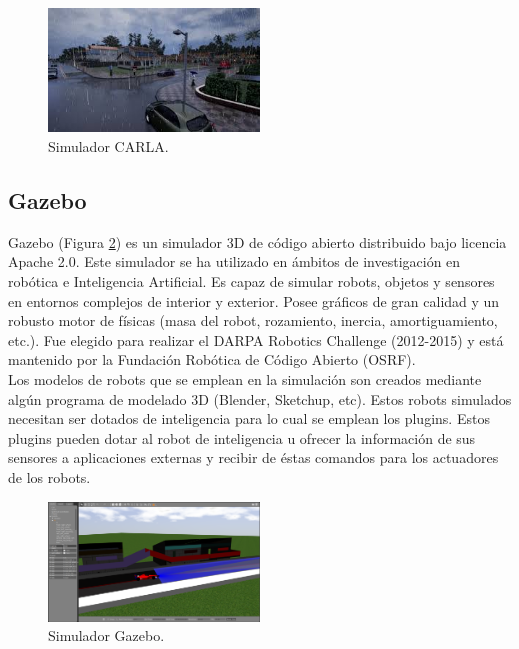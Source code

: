 \begin{figure}
\begin{center}
	\includegraphics[width=0.5\textwidth]{figures/Estado_arte/carla.jpeg}
   \caption{Simulador CARLA.}
	\label{fig.carla}
\end{center}
\end{figure}


\subsection{Gazebo}

Gazebo \cite{gazebo1} (Figura \ref{fig.gazebo}) es un simulador 3D de código abierto distribuido bajo licencia Apache 2.0. Este simulador se ha utilizado en ámbitos de investigación en robótica e Inteligencia Artificial. Es capaz de simular robots, objetos y sensores en entornos complejos de interior y exterior. Posee gráficos de gran calidad y un robusto motor de físicas (masa del robot, rozamiento, inercia, amortiguamiento, etc.). Fue elegido para realizar el DARPA Robotics Challenge (2012-2015) y está mantenido por la Fundación Robótica de Código Abierto (OSRF).\\

Los modelos de robots que se emplean en la simulación son creados mediante algún programa de modelado 3D (Blender, Sketchup, etc). Estos robots simulados necesitan ser dotados de inteligencia para lo cual se emplean los plugins. Estos plugins pueden dotar al robot de inteligencia u ofrecer la información de sus sensores a aplicaciones externas y recibir de éstas comandos para los actuadores de los robots.

\begin{figure}
\begin{center}
	\includegraphics[width=0.5\textwidth]{figures/Estado_arte/gazebo.png}
   \caption{Simulador Gazebo.}
	\label{fig.gazebo}
\end{center}
\end{figure}


